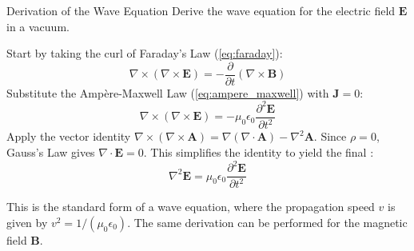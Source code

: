 \begin{workedexample}{Derivation of the Wave Equation}
    Derive the wave equation for the electric field $\mathbf{E}$ in a vacuum.
    
    \begin{derivationsteps}
        \step Start by taking the curl of Faraday's Law (\cref{eq:faraday}):
          \[ \nabla \times (\nabla \times \mathbf{E}) = -\frac{\partial}{\partial t}(\nabla \times \mathbf{B}) \]
        \step Substitute the Ampère-Maxwell Law (\cref{eq:ampere_maxwell}) with $\mathbf{J}=0$:
          \[ \nabla \times (\nabla \times \mathbf{E}) = -\mu_0 \epsilon_0 \frac{\partial^2 \mathbf{E}}{\partial t^2} \]
        \step Apply the vector identity $\nabla \times (\nabla \times \mathbf{A}) = \nabla(\nabla \cdot \mathbf{A}) - \nabla^2 \mathbf{A}$. Since $\rho=0$, Gauss's Law gives $\nabla \cdot \mathbf{E} = 0$. This simplifies the identity to yield the final :
          \begin{equation}
              \nabla^2 \mathbf{E} = \mu_0 \epsilon_0 \frac{\partial^2 \mathbf{E}}{\partial t^2}
              \label{eq:wave_equation}
          \end{equation}
    \end{derivationsteps}
    This is the standard form of a wave equation, where the propagation speed $v$ is given by $v^2 = 1/(\mu_0 \epsilon_0)$. The same derivation can be performed for the magnetic field $\mathbf{B}$.
\end{workedexample}

